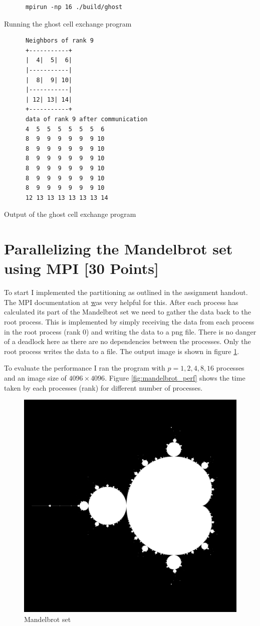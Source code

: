 \documentclass[unicode,11pt,a4paper,oneside,numbers=endperiod,openany]{scrartcl}
\begin{document}
\begin{listing}[h!t]
      \begin{verbatim}
      mpirun -np 16 ./build/ghost
      \end{verbatim}
      \caption{Running the ghost cell exchange program}
      \label{lst:ghost_run}
\end{listing}

\begin{listing}[h!t]
      \begin{verbatim}
      Neighbors of rank 9
      +-----------+
      |  4|  5|  6|
      |-----------|
      |  8|  9| 10|
      |-----------|
      | 12| 13| 14|
      +-----------+
      data of rank 9 after communication
      4  5  5  5  5  5  5  6 
      8  9  9  9  9  9  9 10 
      8  9  9  9  9  9  9 10 
      8  9  9  9  9  9  9 10 
      8  9  9  9  9  9  9 10 
      8  9  9  9  9  9  9 10 
      8  9  9  9  9  9  9 10 
      12 13 13 13 13 13 13 14 
      \end{verbatim}
      \caption{Output of the ghost cell exchange program}
      \label{lst:ghost_output}
\end{listing}


\section{Parallelizing the Mandelbrot set using MPI [30 Points]}

To start I implemented the partitioning as outlined in the assignment handout. The MPI documentation at \href{https://rookiehpc.org/mpi/docs/} was very helpful for this. After each process has calculated its part of the Mandelbrot set we need to gather the data back to the root process. This is implemented by simply receiving the data from each process in the root process (rank 0) and writing the data to a png file. There is no danger of a deadlock here as there are no dependencies between the processes. Only the root process writes the data to a file. The output image is shown in figure \ref{fig:mandelbrot}.

To evaluate the performance I ran the program with $p = 1, 2, 4, 8, 16$ processes and an image size of $4096 \times 4096$. Figure \ref{fig:mandelbrot_perf} shows the time taken by each processes (rank) for different number of processes.

\begin{figure}
      \centering
      \includegraphics[width=.5\linewidth]{plots/mandel.png}
      \caption{Mandelbrot set}
      \label{fig:mandelbrot}
\end{figure}
\end{document}
